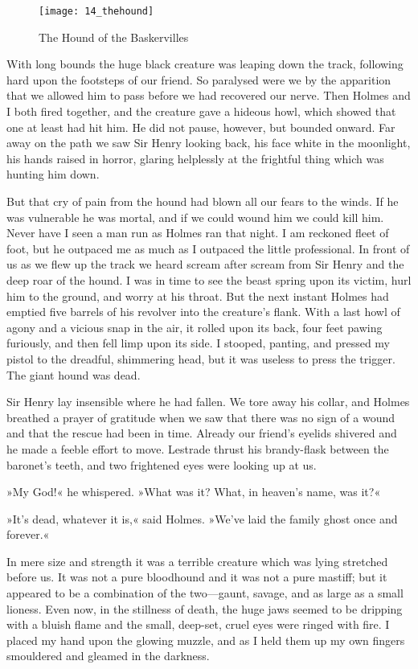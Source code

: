 \begin{figure}[tbph]
\centering
\texttt{[image: 14\_thehound]}
\caption{The Hound of the Baskervilles}
\end{figure}

With long bounds the huge black creature was leaping down the track, following hard upon the footsteps of our friend. So paralysed were we by the apparition that we allowed him to pass before we had recovered our nerve. Then Holmes and I both fired together, and the creature gave a hideous howl, which showed that one at least had hit him. He did not pause, however, but bounded onward. Far away on the path we saw Sir Henry looking back, his face white in the moonlight, his hands raised in horror, glaring helplessly at the frightful thing which was hunting him down.

But that cry of pain from the hound had blown all our fears to the winds. If he was vulnerable he was mortal, and if we could wound him we could kill him. Never have I seen a man run as Holmes ran that night. I am reckoned fleet of foot, but he outpaced me as much as I outpaced the little professional. In front of us as we flew up the track we heard scream after scream from Sir Henry and the deep roar of the hound. I was in time to see the beast spring upon its victim, hurl him to the ground, and worry at his throat. But the next instant Holmes had emptied five barrels of his revolver into the creature's flank. With a last howl of agony and a vicious snap in the air, it rolled upon its back, four feet pawing furiously, and then fell limp upon its side. I stooped, panting, and pressed my pistol to the dreadful, shimmering head, but it was useless to press the trigger. The giant hound was dead.



Sir Henry lay insensible where he had fallen. We tore away his collar, and Holmes breathed a prayer of gratitude when we saw that there was no sign of a wound and that the rescue had been in time. Already our friend's eyelids shivered and he made a feeble effort to move. Lestrade thrust his brandy-flask between the baronet's teeth, and two frightened eyes were looking up at us.

»My God!« he whispered. »What was it? What, in heaven's name, was it?«

»It's dead, whatever it is,« said Holmes. »We've laid the family ghost once and forever.«

In mere size and strength it was a terrible creature which was lying stretched before us. It was not a pure bloodhound and it was not a pure mastiff; but it appeared to be a combination of the two—gaunt, savage, and as large as a small lioness. Even now, in the stillness of death, the huge jaws seemed to be dripping with a bluish flame and the small, deep-set, cruel eyes were ringed with fire. I placed my hand upon the glowing muzzle, and as I held them up my own fingers smouldered and gleamed in the darkness.


